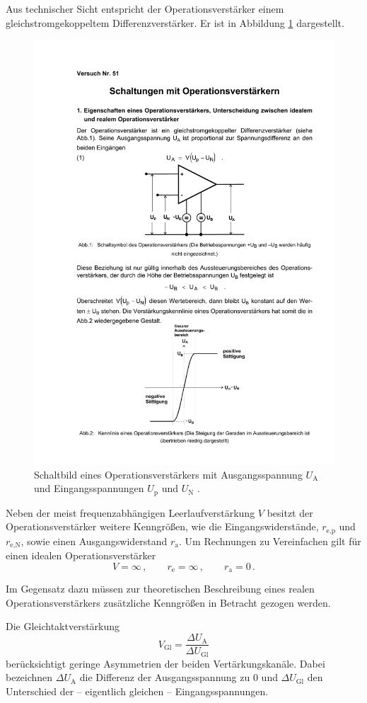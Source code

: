Aus technischer Sicht entspricht der Operationsverstärker einem
gleichstromgekoppeltem Differenzverstärker. Er ist in Abbildung
\ref{fig:op} dargestellt.
\begin{figure}
    \centering
    \includegraphics[width=0.5\linewidth]{img/op.pdf}
    \caption{
        Schaltbild eines Operationsverstärkers mit Ausgangsspannung
        $U_\text{A}$ und Eingangsspannungen $U_\text{p}$ und
        $U_\text{N}$ \cite{V51}.
    }
    \label{fig:op}
\end{figure}
Neben der meist frequenzabhängigen Leerlaufverstärkung $V$ besitzt der
Operationsverstärker weitere Kenngrößen, wie die Eingangswiderstände,
$r_\text{e,p}$ und $r_\text{e,N}$, sowie 
einen Ausgangswiderstand $r_\text{a}$.
Um Rechnungen zu Vereinfachen gilt für einen idealen Operationsverstärker
\begin{equation}
\label{eq:id-verstärker}
    V = \infty\,,\qquad r_\text{e} = \infty\,,\qquad r_\text{a} = 0\,.
\end{equation}

Im Gegensatz dazu müssen zur theoretischen Beschreibung eines realen
Operationsverstärkers zusätzliche Kenngrößen in Betracht gezogen werden.

Die Gleichtaktverstärkung
\begin{equation}
\label{eq:gleichtaktverstärkung}
    V_\text{Gl} = \frac{\Delta U_\text{A}}{\Delta U_\text{Gl}}
\end{equation}
berücksichtigt geringe Asymmetrien der beiden Vertärkungskanäle.
Dabei bezeichnen $\Delta U_\text{A}$ die Differenz der Ausgangsspannung zu
\num{0} und $\Delta U_\text{Gl}$ den Unterschied der -- eigentlich gleichen --
Eingangsspannungen.

